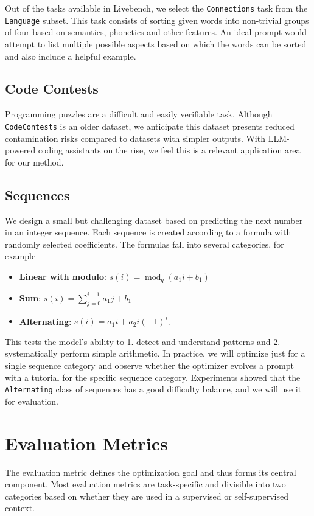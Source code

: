 Out of the tasks available in Livebench, we select the \texttt{Connections} task from the \texttt{Language} subset. 
This task consists of sorting given words into non-trivial groups of four based on semantics, phonetics and other features. 
An ideal prompt would attempt to list multiple possible aspects based on which the words can be sorted and also include a helpful example.

\subsection{Code Contests}
Programming puzzles are a difficult and easily verifiable task. Although \texttt{CodeContests}\cite{li2022competition} is an older dataset, 
we anticipate this dataset presents reduced contamination risks compared to datasets with simpler outputs. With LLM-powered coding assistants on the rise, we
feel this is a relevant application area for our method. 

\subsection{Sequences}
We design a small but challenging dataset based on predicting the next number in an integer sequence.
Each sequence is created according to a formula with randomly selected coefficients. The formulas fall into several categories, for example
\begin{itemize}
    \item \textbf{Linear with modulo}: $s(i) = \operatorname{mod}_{q}(a_{1} i + b_{1})$
    \item \textbf{Sum}: $s(i) = \sum_{j=0}^{i-1}a_{1} j + b_{1}$
    \item \textbf{Alternating}: $s(i) = a_{1}i + a_{2}i(-1)^{i}$.
\end{itemize}
This tests the model's ability to 1. detect and understand patterns and 2. systematically perform simple arithmetic. 
In practice, we will optimize just for a single sequence category and observe whether the optimizer evolves a prompt with a tutorial for the specific sequence category.
Experiments showed that the \texttt{Alternating} class of sequences has a good difficulty balance, and we will use it for evaluation.

\section{Evaluation Metrics}
The evaluation metric defines the optimization goal and thus forms its central component. 
Most evaluation metrics are task-specific and divisible into two categories based on whether they are used in a supervised or self-supervised context.
